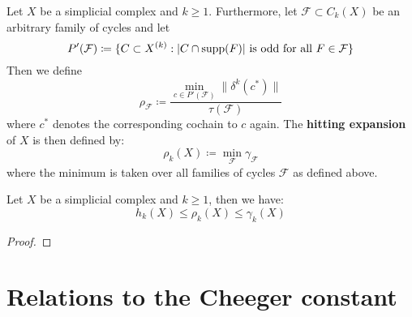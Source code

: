 \begin{defi}
Let \(X\) be a simplicial complex and \(k\geq 1\). Furthermore, let \(\mathcal{F}\subset C_k(X)\) be an arbitrary family of cycles and let
\[
P'(\mathcal{F})\coloneqq\{C\subset X^{(k)}:|C\cap\mathrm{supp}(F)|\text{ is odd for all }F\in\mathcal{F}\}
\]
Then we define
\[
\rho_{\mathcal{F}}\coloneqq\frac{\min\limits_{c\in P'(\mathcal{F})}\|\delta^k(c^*)\|}{\tau(\mathcal{F})}
\]
where \(c^*\) denotes the corresponding cochain to \(c\) again. The \textbf{hitting expansion} of \(X\) is then defined by:
\[
\rho_k(X)\coloneqq\min\limits_{\mathcal{F}}\gamma_{\mathcal{F}}
\]
where the minimum is taken over all families of cycles \(\mathcal{F}\) as defined above.
\end{defi}

\begin{prop}
Let \(X\) be a simplicial complex and \(k\geq 1\), then we have:
\[
h_k(X)\leq\rho_k(X)\leq\gamma_k(X)
\]
\begin{proof}

\end{proof}
\end{prop}

\section{Relations to the Cheeger constant}


